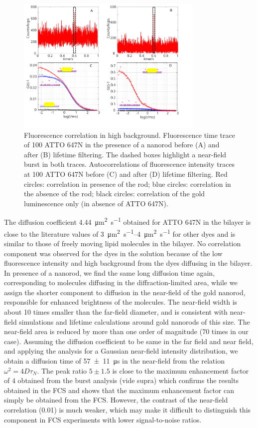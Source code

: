 \begin{figure}[ht]
	\centering
	\includegraphics[width=0.8\textwidth]{corr_enhnc}
	\caption{Fluorescence correlation in high background. Fluorescence time trace of \SI{100}{\nM} ATTO 647N in the 
	presence of a nanorod before (A) and after (B) lifetime filtering. The dashed boxes highlight a near-field 
	burst in both traces. Autocorrelations of fluorescence intensity traces at \SI{100}{\nM} ATTO 647N before (C) and 
	after (D) lifetime filtering. Red circles: correlation in presence of the rod; blue circles: correlation in the 
	absence of the rod; black circles: correlation of the gold luminescence only (in absence of ATTO 647N).}
	\label{fig:corr_enhnc}
\end{figure}

The diffusion coefficient \SI{4.44}{\um\squared\per\s} obtained for ATTO 647N in the bilayer is close to the literature values of \SIrange{3}{4}{\um\squared\per\s}\cite{mach2010lipid} for other dyes and is similar to those of freely moving lipid molecules in the bilayer.
No correlation component was observed for the dyes in the solution because of the low fluorescence intensity and high background from the dyes diffusing in the bilayer.
In presence of a nanorod, we find the same long diffusion time again, corresponding to molecules diffusing in the diffraction-limited area, while we assign the shorter component to diffusion in the near-field of the gold nanorod, responsible for enhanced brightness of the molecules.
The near-field width is about 10 times smaller than the far-field diameter, and is consistent with near-field simulations and lifetime calculations around gold nanorods
of this size.\cite{khatua2014resonant,seelig2007nanoparticleinduced}
The near-field area is reduced by more than one order of magnitude (70 times in our case).
Assuming the diffusion coefficient to be same in the far field and near field, and applying the analysis for a Gaussian near-field intensity distribution, we obtain a diffusion 
time of \SI[separate-uncertainty = true]{57(11)}{\us} in the near-field from the relation $\omega^2=4D\tau_N$.
The peak ratio $5\pm1.5$ is close to the maximum enhancement factor of $4$ obtained from the burst analysis (vide supra) which confirms the results 
obtained in the FCS and shows that the maximum enhancement factor can simply be obtained from the FCS.
However, the contrast of the near-field correlation (0.01) is much weaker, which may make it difficult to distinguish this component in FCS experiments with lower signal-to-noise ratios.

